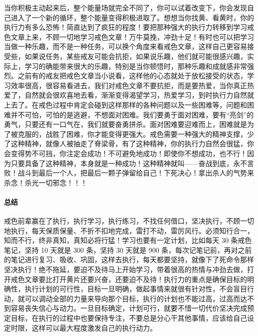 当你积极主动起来后，整个能量场就完全不同了，你可以试着改变下，你会发现自己进入了一个新的循环，整个能量变得积极进取了。想想当你找黄、看黄时，你的执行力有多么恐怖！简直达到了疯狂的程度！要把那种强大的执行力转移到学习戒色文章上来，不顾一切地学习戒色文章！万牛莫挽，冲劲十足！有时也可以把学习当做一种乐趣，而不是一种任务，可以换个角度来看戒色文章，这样自己更容易接受些，如果说任务，某些戒友可能会抗拒，如果说乐趣，他们就可能很感兴趣，实际上，学习的确能带来很大的乐趣，特别是当你顿悟时，那种乐趣和成就感非常强烈。之前有的戒友把戒色文章当小说看，这样他的心态就处于放松接受的状态，学习效率很高，很容易看进去，我们对戒色文章不要抗拒，而是要热爱，当你真正热爱了，自然就会很欢喜地去看，渐渐变得渴望学习，热爱学习，到时执行力自然就上去了。在戒色过程中肯定会碰到这样那样的各种问题以及一些困难等，问题和困难并不可怕，可怕的是逃避，不想面对困难。我们要勇于面对困难，要有“亮剑”的勇气，只要还有一口气在，我们就要奋勇拼杀。面对困难要迎难而上，困难就是为了被克服的，战胜了困难，你才能变得更强大。戒色需要一种强大的精神支撑，少了这种精神，就像人被抽走了脊梁骨，有了这种精神，你的执行力自然会很猛，你会变得势不可挡，你注定会成功！不可避免地成功！即使你不想成功，也不行！因为只要具备了这种精神，本身就是一种成功！这种精神就叫——奋战到底，永不言败！战斗到最后一个人，把最后一颗子弹留给自己！下死决心！拿出杀人的气势来杀念！杀光一切邪念！！！

\paragraph{总结}

戒色前辈赢在了执行，执行学习，执行练习，不找任何借口，坚决执行，不顾一切地执行，每天保质保量、不折不扣地完成，雷打不动，雷厉风行。必须知行合一，知而不行，终非真知，真知必将行猛！学习也要有一定计划，比如每天 30 条戒色笔记，坚持 10 天就是 300 条，坚持 30 天就是 900 条，每次记笔记前，再对之前的笔记进行复习、吸收、巩固，这样去执行，每天都要坚持，就像下了死命令那样坚决执行！绝不拖延，要迫不及待马上开始学习，带着很高的热情与冲劲去做，打开戒色文章要比打开黄片还要兴奋，还要迫不及待！执行力的重点是确保目标的明确性，执行计划的可行性，目标一旦明确，做起事情来就很有针对性，不会盲目行动，就可以调动全部的力量来导向那个目标，执行的计划也不能过高，过高而达不到容易丧失信心与动力。一旦目标确定，计划可行，就要不惜一切代价坚决完成预定目标，在执行的过程中也要保持专注，不要总是分心干其他事情，应该给自己设定时限，这样可以最大程度激发自己的执行动力。

